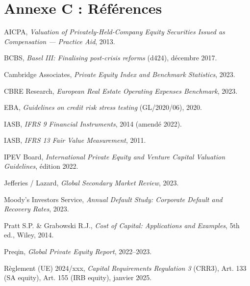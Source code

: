 \documentclass[12pt,a4paper]{article}
\begin{document}
\section{Annexe C : R\'{e}f\'{e}rences}
\label{sec:references}

\begin{enumerate}[label={[\arabic*]}]
    \item AICPA, \textit{Valuation of Privately-Held-Company Equity Securities Issued as Compensation --- Practice Aid}, 2013.
    \item BCBS, \textit{Basel III: Finalising post-crisis reforms} (d424), d\'{e}cembre 2017.
    \item Cambridge Associates, \textit{Private Equity Index and Benchmark Statistics}, 2023.
    \item CBRE Research, \textit{European Real Estate Operating Expenses Benchmark}, 2023.
    \item EBA, \textit{Guidelines on credit risk stress testing} (GL/2020/06), 2020.
    \item IASB, \textit{IFRS 9 Financial Instruments}, 2014 (amend\'{e} 2022).
    \item IASB, \textit{IFRS 13 Fair Value Measurement}, 2011.
    \item IPEV Board, \textit{International Private Equity and Venture Capital Valuation Guidelines}, \'{e}dition 2022.
    \item Jefferies / Lazard, \textit{Global Secondary Market Review}, 2023.
    \item Moody's Investors Service, \textit{Annual Default Study: Corporate Default and Recovery Rates}, 2023.
    \item Pratt S.P. \& Grabowski R.J., \textit{Cost of Capital: Applications and Examples}, 5th ed., Wiley, 2014.
    \item Preqin, \textit{Global Private Equity Report}, 2022--2023.
    \item R\`{e}glement (UE) 2024/xxx, \textit{Capital Requirements Regulation 3} (CRR3), Art. 133 (SA equity), Art. 155 (IRB equity), janvier 2025.
\end{enumerate}
\end{document}
